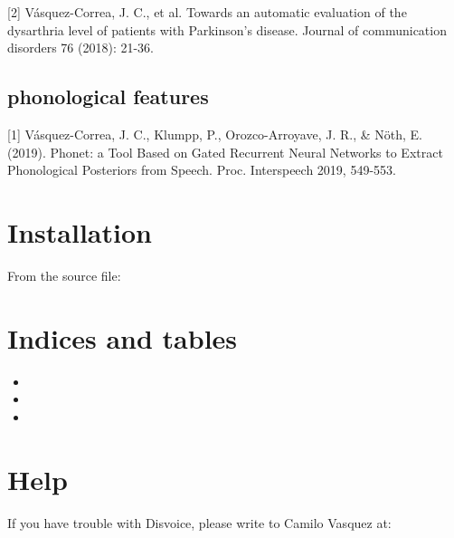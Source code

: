 \documentclass[letterpaper,10pt,english]{sphinxmanual}
\begin{document}
{[}2{]} Vásquez-Correa, J. C., et al. \sphinxquotedblleft{}Towards an automatic evaluation of the dysarthria level of patients with Parkinson's disease.\sphinxquotedblright{} Journal of communication disorders 76 (2018): 21-36.


\section{phonological features}
\label{\detokenize{reference:phonological-features}}
{[}1{]} Vásquez-Correa, J. C., Klumpp, P., Orozco-Arroyave, J. R., \& Nöth, E. (2019). Phonet: a Tool Based on Gated Recurrent Neural Networks to Extract Phonological Posteriors from Speech. Proc. Interspeech 2019, 549-553.


\chapter{Installation}
\label{\detokenize{index:installation}}
From the source file:

\begin{sphinxVerbatim}[commandchars=\\\{\}]
  
 
 
\end{sphinxVerbatim}


\chapter{Indices and tables}
\label{\detokenize{index:indices-and-tables}}\begin{itemize}
\item {} 

\item {} 

\item {} 

\end{itemize}


\chapter{Help}
\label{\detokenize{index:help}}
If you have trouble with Disvoice, please write to Camilo Vasquez at: 
\end{document}
